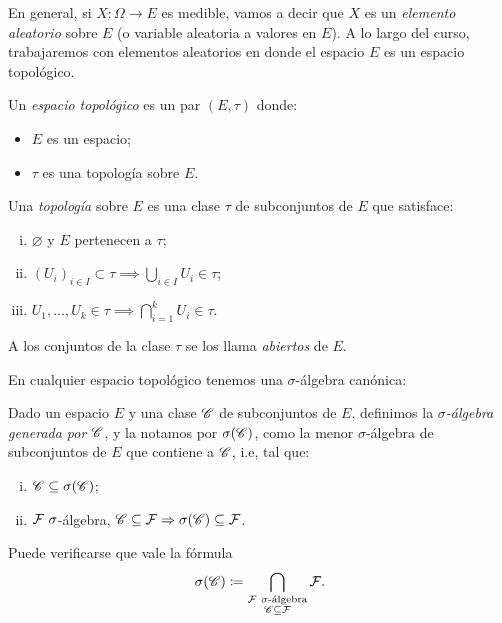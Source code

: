 En general, si $X \colon \Omega \to E$ es medible, vamos a decir que $X$ es un \textit{elemento aleatorio} sobre $E$ (o variable aleatoria a valores en $E$). A lo largo del curso, trabajaremos con elementos aleatorios en donde el espacio $E$ es un espacio topológico.

\begin{definition}
	Un \textit{espacio topológico} es un par $(E, \tau)$ donde:
	\begin{itemize}
		\item $E$ es un espacio;

		\item $\tau$ es una topología sobre $E$.
	\end{itemize}
	Una \textit{topología} sobre $E$ es una clase $\tau$ de subconjuntos de $E$ que satisface:
	\begin{enumerate}[i)]
		\item $\varnothing$ y $E$ pertenecen a $\tau$;

		\item $(U_{i})_{i \in I} \subset \tau \implies \bigcup_{i \in I} U_{i} \in \tau$;

		\item $U_{1}, \dots, U_{k} \in \tau \implies \bigcap_{i=1}^{k} U_{i} \in \tau$.
	\end{enumerate}
	A los conjuntos de la clase $\tau$ se los llama \textit{abiertos} de $E$.
\end{definition}
\medskip
\par En cualquier espacio topológico tenemos una $\sigma$-álgebra canónica:

\begin{definition}
	Dado un espacio $E$ y una clase $\mathscr{C}$ de subconjuntos de $E$, definimos la \textit{$\sigma$-álgebra generada por $\mathscr{C}$}, y la notamos por $\sigma(\mathscr{C})$, como la menor $\sigma$-álgebra de subconjuntos de $E$ que contiene a $\mathscr{C}$, i.e, tal que:
	\begin{enumerate}[i)]
		\item $\mathscr{C} \subseteq \sigma(\mathscr{C})$;

		\item $\mathcal{F} \ \sigma$-álgebra, $\mathscr{C} \subseteq \mathcal{F} \Rightarrow \sigma(\mathscr{C}) \subseteq \mathcal{F}$.
	\end{enumerate}
\end{definition}

\begin{remark}
	Puede verificarse que vale la fórmula
	\[ \sigma(\mathscr{C}) \coloneq \bigcap_{\substack{\mathcal{F} \ \sigma \text{-álgebra} \\ \mathscr{C} \subseteq \mathcal{F}}} \mathcal{F}. \]
\end{remark}

